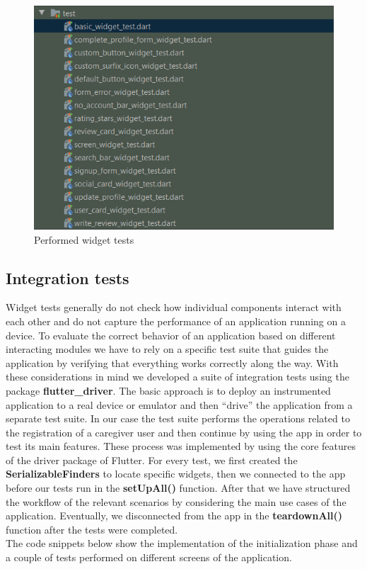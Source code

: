 \documentclass[../../dd.tex]{subfiles}
\begin{document}
	 \begin{figure}[H]
        \centering
        \includegraphics[scale=1.25]{../../assets/widget_tests.png}
        \caption{Performed widget tests}\label{fig:widget-tests}
    \end{figure}

    \subsection{Integration tests}
	Widget tests generally do not check how individual components interact with each other and do not capture the performance of an application running on a device. To evaluate the correct behavior of an application based on different interacting modules we have to rely on a specific test suite that guides the application by verifying that everything works correctly along the way. With these considerations in mind we developed a suite of integration tests using the package \textbf{flutter\_driver}. The basic approach is to deploy an instrumented application to a real device or emulator and then “drive” the application from a separate test suite. In our case the test suite performs the operations related to the registration of a caregiver user and then continue by using the app in order to test its main features. These process was implemented by using the core features of the driver package of Flutter. For every test, we first created the \textbf{SerializableFinders} to locate specific widgets, then we connected to the app before our tests run in the \textbf{setUpAll()} function. After that we have structured the workflow of the relevant scenarios by considering the main use cases of the application. Eventually, we disconnected from the app in the \textbf{teardownAll()} function after the tests were completed.\\
    The code snippets below show the implementation of the initialization phase and a couple of tests performed on different screens of the application.

	\vspace{2 mm}
    
    \vspace{8 mm}
\end{document}
